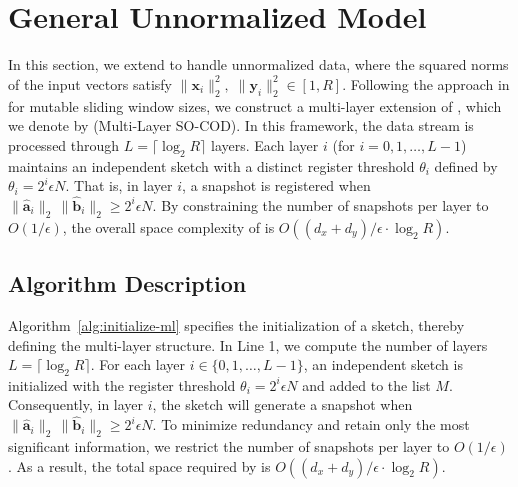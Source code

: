 \section{General Unnormalized Model}\label{sec:unnormalized-setting}




In this section, we extend \oursolution to handle unnormalized data, where the squared norms of the input vectors satisfy \( \|\boldsymbol{x}_i\|_2^2,\;\|\boldsymbol{y}_i\|_2^2 \in [1,R] \). Following the approach in \cite{LeeT06} for mutable sliding window sizes, we construct a multi-layer extension of \oursolution, which we denote by \newsolution (Multi-Layer SO-COD). In this framework, the data stream is processed through \( L = \lceil \log_2 R \rceil \) layers. Each layer \( i \) (for \( i = 0,1,\dots,L-1 \)) maintains an independent \oursolution sketch with a distinct register threshold \( \theta_i \) defined by \( \theta_i = 2^i\epsilon N \). That is, in layer \( i \), a snapshot is registered when \( \|\hat{\boldsymbol{a}}_i\|_2 \,\|\hat{\boldsymbol{b}}_i\|_2 \ge 2^i\epsilon N \). By constraining the number of snapshots per layer to \( O(1/\epsilon) \), the overall space complexity of \newsolution is \( O((d_x+d_y)/\epsilon \cdot \log_2 R) \).



\subsection{Algorithm Description}
Algorithm~\ref{alg:initialize-ml} specifies the initialization of a \newsolution sketch, thereby defining the multi-layer structure. In Line 1, we compute the number of layers \( L = \lceil \log_2 R \rceil \). For each layer \( i \in \{0, 1, \dots, L-1\} \), an independent \oursolution sketch is initialized with the register threshold \( \theta_i = 2^i\epsilon N \) and added to the list $M$. Consequently, in layer \( i \), the \oursolution sketch will generate a snapshot when \( \|\hat{\boldsymbol{a}}_i\|_2 \,\|\hat{\boldsymbol{b}}_i\|_2 \ge 2^i\epsilon N \). To minimize redundancy and retain only the most significant information, we restrict the number of snapshots per layer to \( O(1/\epsilon) \). As a result, the total space required by \newsolution is \( O((d_x+d_y)/\epsilon \cdot \log_2 R) \).

    
    


